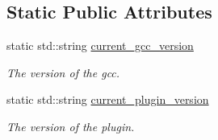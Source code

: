 \subsection*{Static Public Attributes}
\begin{DoxyCompactItemize}
\item 
static std\+::string \hyperlink{classGccWrapper_afa95c1f83a36684f6aeec040aa3b281c}{current\+\_\+gcc\+\_\+version}
\begin{DoxyCompactList}\small\item\em The version of the gcc. \end{DoxyCompactList}\item 
static std\+::string \hyperlink{classGccWrapper_a96b3eea05021578e49f12fa1502c4ddf}{current\+\_\+plugin\+\_\+version}
\begin{DoxyCompactList}\small\item\em The version of the plugin. \end{DoxyCompactList}\end{DoxyCompactItemize}
